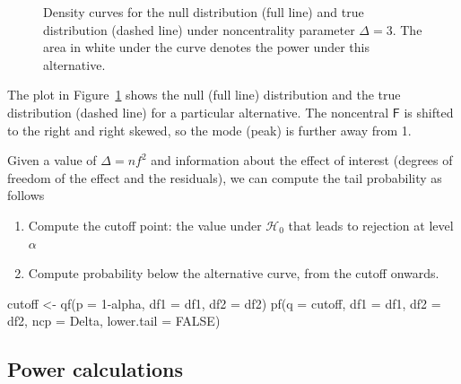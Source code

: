 \documentclass[
  11pt,
  letterpaper,
]{scrbook}
\newenvironment{Shaded}{\begin{snugshade}}{\end{snugshade}}
\newcommand{\AttributeTok}[1]{\textcolor[rgb]{0.40,0.45,0.13}{#1}}
\newcommand{\ConstantTok}[1]{\textcolor[rgb]{0.56,0.35,0.01}{#1}}
\newcommand{\DecValTok}[1]{\textcolor[rgb]{0.68,0.00,0.00}{#1}}
\newcommand{\FunctionTok}[1]{\textcolor[rgb]{0.28,0.35,0.67}{#1}}
\newcommand{\NormalTok}[1]{\textcolor[rgb]{0.00,0.23,0.31}{#1}}
\newcommand{\OtherTok}[1]{\textcolor[rgb]{0.00,0.23,0.31}{#1}}
\newcommand{\SpecialCharTok}[1]{\textcolor[rgb]{0.37,0.37,0.37}{#1}}
\providecommand{\tightlist}{%
  \setlength{\itemsep}{0pt}\setlength{\parskip}{0pt}}\usepackage{longtable,booktabs,array}
\theoremstyle{definition}
\theoremstyle{definition}
\theoremstyle{remark}
\begin{document}
\begin{figure}[ht!]


\caption{\label{fig-powercurve}Density curves for the null distribution
(full line) and true distribution (dashed line) under noncentrality
parameter \(\Delta=3\). The area in white under the curve denotes the
power under this alternative.}

\end{figure}%

The plot in Figure~\ref{fig-powercurve} shows the null (full line)
distribution and the true distribution (dashed line) for a particular
alternative. The noncentral \(\mathsf{F}\) is shifted to the right and
right skewed, so the mode (peak) is further away from 1.

Given a value of \(\Delta=nf^2\) and information about the effect of
interest (degrees of freedom of the effect and the residuals), we can
compute the tail probability as follows

\begin{enumerate}
\def\labelenumi{\arabic{enumi}.}
\tightlist
\item
  Compute the cutoff point: the value under \(\mathscr{H}_0\) that leads
  to rejection at level \(\alpha\)
\item
  Compute probability below the alternative curve, from the cutoff
  onwards.
\end{enumerate}

\begin{Shaded}
\begin{Highlighting}[]
\NormalTok{cutoff }\OtherTok{\textless{}{-}} \FunctionTok{qf}\NormalTok{(}\AttributeTok{p =} \DecValTok{1}\SpecialCharTok{{-}}\NormalTok{alpha, }\AttributeTok{df1 =}\NormalTok{ df1, }\AttributeTok{df2 =}\NormalTok{ df2)}
\FunctionTok{pf}\NormalTok{(}\AttributeTok{q =}\NormalTok{ cutoff,  }\AttributeTok{df1 =}\NormalTok{ df1, }\AttributeTok{df2 =}\NormalTok{ df2, }
    \AttributeTok{ncp =}\NormalTok{ Delta, }\AttributeTok{lower.tail =} \ConstantTok{FALSE}\NormalTok{)}
\end{Highlighting}
\end{Shaded}

\subsection{Power calculations}\label{power-calculations}
\end{document}

